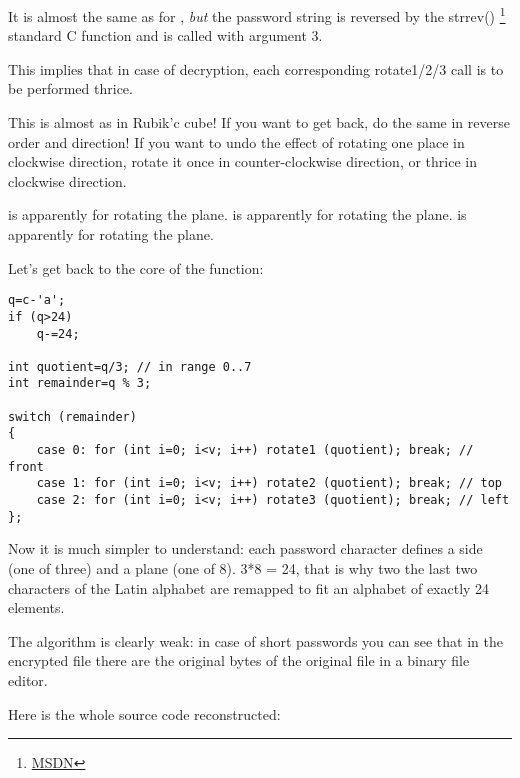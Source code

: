 It is almost the same as for , \emph{but} the password string is reversed by the
strrev() \footnote{\href{http://msdn.microsoft.com/en-us/library/9hby7w40(VS.80).aspx}{MSDN}}
standard C function and  is called with argument 3. 

This implies that in case of decryption, each corresponding rotate1/2/3 call is to be performed thrice.

This is almost as in Rubik'c cube! 
If you want to get back, do the same in reverse order and direction! 
If you want to undo the effect of rotating one place in clockwise direction, 
rotate it once in counter-clockwise direction, or thrice in clockwise direction.

 is apparently for rotating the  plane. 
 is apparently for rotating the  plane. 
 is apparently for rotating the  plane.

Let's get back to the core of the  function:

\begin{lstlisting}[style=customc]
q=c-'a';
if (q>24)
	q-=24;

int quotient=q/3; // in range 0..7
int remainder=q % 3;

switch (remainder)
{
    case 0: for (int i=0; i<v; i++) rotate1 (quotient); break; // front
    case 1: for (int i=0; i<v; i++) rotate2 (quotient); break; // top
    case 2: for (int i=0; i<v; i++) rotate3 (quotient); break; // left
};
\end{lstlisting}

Now it is much simpler to understand: each password character defines a side (one of three) and a plane (one of 8). 
3*8 = 24, that is why two the last two characters of the Latin alphabet are remapped to fit an alphabet of exactly 
24 elements.

The algorithm is clearly weak: in case of short passwords you can see
that in the encrypted file there are 
the original bytes of the original file in a binary file editor.

Here is the whole source code reconstructed:



